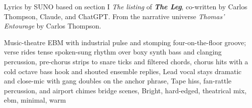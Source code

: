 
\begin{notes}
Lyrics by SUNO based on section I \emph{The listing} of \emph{\bfseries The Leg}, %
co-written by Carlos Thompson, Claude, and ChatGPT. %
From the narrative universe \emph{Thomas’ Entourage} by Carlos Thompson.
\end{notes}
\begin{style}
Music-theatre EBM with industrial pulse and stomping four-on-the-floor groove; verse rides tense spoken-sung rhythm over boxy synth bass and clanging percussion, pre-chorus strips to snare ticks and filtered chords, chorus hits with a cold octave bass hook and shouted ensemble replies, Lead vocal stays dramatic and close-mic with gang doubles on the anchor phrase, Tape hiss, fan-rattle percussion, and airport chimes bridge scenes, Bright, hard-edged, theatrical mix, ebm, minimal, warm
\end{style}
